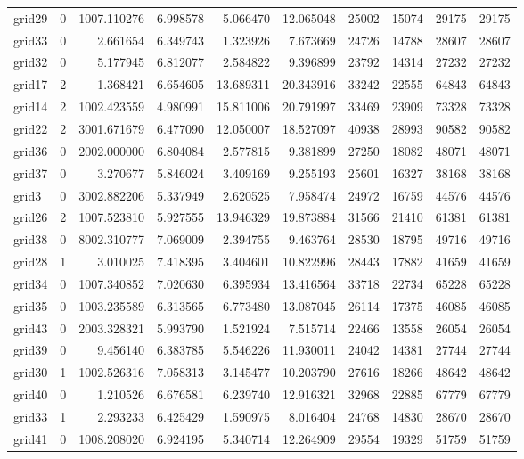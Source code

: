 \begin{longtable}{|l|r|r|r|r|r|r|r|r|r|}
grid29 & 0 & 1007.110276 & 6.998578 & 5.066470 & 12.065048 & 25002 & 15074 & 29175 & 29175 \\
grid33 & 0 & 2.661654 & 6.349743 & 1.323926 & 7.673669 & 24726 & 14788 & 28607 & 28607 \\
grid32 & 0 & 5.177945 & 6.812077 & 2.584822 & 9.396899 & 23792 & 14314 & 27232 & 27232 \\
grid17 & 2 & 1.368421 & 6.654605 & 13.689311 & 20.343916 & 33242 & 22555 & 64843 & 64843 \\
grid14 & 2 & 1002.423559 & 4.980991 & 15.811006 & 20.791997 & 33469 & 23909 & 73328 & 73328 \\
grid22 & 2 & 3001.671679 & 6.477090 & 12.050007 & 18.527097 & 40938 & 28993 & 90582 & 90582 \\
grid36 & 0 & 2002.000000 & 6.804084 & 2.577815 & 9.381899 & 27250 & 18082 & 48071 & 48071 \\
grid37 & 0 & 3.270677 & 5.846024 & 3.409169 & 9.255193 & 25601 & 16327 & 38168 & 38168 \\
grid3 & 0 & 3002.882206 & 5.337949 & 2.620525 & 7.958474 & 24972 & 16759 & 44576 & 44576 \\
grid26 & 2 & 1007.523810 & 5.927555 & 13.946329 & 19.873884 & 31566 & 21410 & 61381 & 61381 \\
grid38 & 0 & 8002.310777 & 7.069009 & 2.394755 & 9.463764 & 28530 & 18795 & 49716 & 49716 \\
grid28 & 1 & 3.010025 & 7.418395 & 3.404601 & 10.822996 & 28443 & 17882 & 41659 & 41659 \\
grid34 & 0 & 1007.340852 & 7.020630 & 6.395934 & 13.416564 & 33718 & 22734 & 65228 & 65228 \\
grid35 & 0 & 1003.235589 & 6.313565 & 6.773480 & 13.087045 & 26114 & 17375 & 46085 & 46085 \\
grid43 & 0 & 2003.328321 & 5.993790 & 1.521924 & 7.515714 & 22466 & 13558 & 26054 & 26054 \\
grid39 & 0 & 9.456140 & 6.383785 & 5.546226 & 11.930011 & 24042 & 14381 & 27744 & 27744 \\
grid30 & 1 & 1002.526316 & 7.058313 & 3.145477 & 10.203790 & 27616 & 18266 & 48642 & 48642 \\
grid40 & 0 & 1.210526 & 6.676581 & 6.239740 & 12.916321 & 32968 & 22885 & 67779 & 67779 \\
grid33 & 1 & 2.293233 & 6.425429 & 1.590975 & 8.016404 & 24768 & 14830 & 28670 & 28670 \\
grid41 & 0 & 1008.208020 & 6.924195 & 5.340714 & 12.264909 & 29554 & 19329 & 51759 & 51759 \\

\end{longtable}
